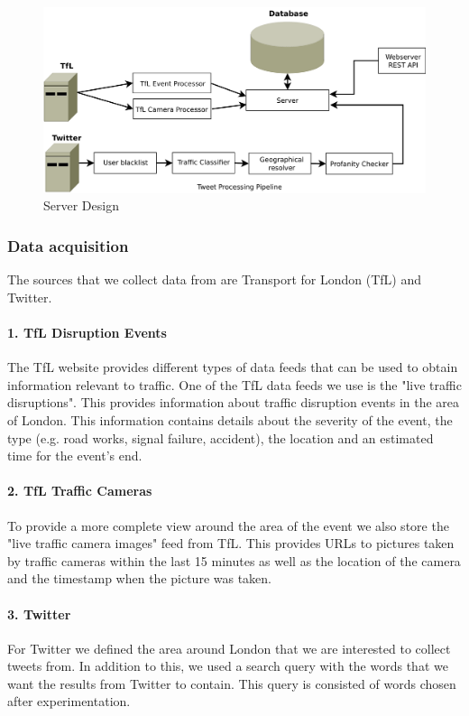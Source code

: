 \begin{figure}[htb]
\centering
\includegraphics[width=1\textwidth]{images/design/server/server.pdf}
\caption{Server Design}
\label{fig:server_design}
\end{figure}

\subsubsection{Data acquisition}
The sources that we collect data from are Transport for London (TfL) and Twitter.

\paragraph{1. TfL Disruption Events}
The TfL website provides different types of data feeds that can be used to obtain information relevant to traffic. 
One of the TfL data feeds we use is the "live traffic disruptions". This provides information about traffic disruption events in the area of London. This information contains details about the severity of the event, the type (e.g. road works, signal failure, accident), the location and an estimated time for the event's end.

\paragraph{2. TfL Traffic Cameras}
To provide a more complete view around the area of the event we also store the "live traffic camera images" feed from TfL. This provides URLs to pictures taken by traffic cameras within the last 15 minutes as well as the location of the camera and the timestamp when the picture was taken.

\paragraph{3. Twitter}
For Twitter we defined the area around London that we are interested to collect tweets from. In addition to this, we used a search query with the words that we want the results from Twitter to contain. This query is consisted of words chosen after experimentation.


